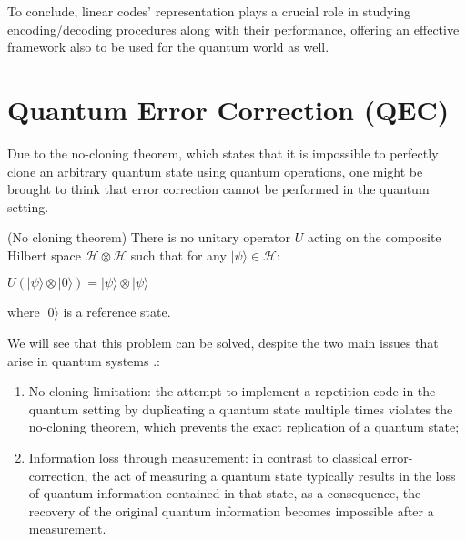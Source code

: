 \documentclass{Configuration_Files/PoliMi3i_thesis}
\begin{document}
To conclude, linear codes' representation plays a crucial role in studying encoding/decoding procedures along with their performance, offering an effective framework also to be used for the quantum world as well.










\newpage
\section{Quantum Error Correction (QEC)}
\label{sec:QEC}

Due to the no-cloning theorem, which states that  it is impossible to perfectly clone an arbitrary quantum state using quantum operations, one might be brought to think that error correction cannot be performed in the quantum setting.

\begin{theorem}(No cloning theorem)
	There is no unitary operator $U$ acting on the composite Hilbert space $\mathscr{H} \otimes \mathscr{H}$ such that for any $|\psi\rangle \in \mathscr{H}$:
	
	\begin{center}
		$U(|\psi\rangle\otimes|0\rangle) = |\psi\rangle \otimes |\psi\rangle$
	\end{center}
	
	where $|0\rangle$ is a reference state.
\end{theorem}

We will see that this problem can be solved, despite the two main issues that arise in quantum systems \cite{Cha06}.: 

\begin{enumerate}
	\item No cloning limitation: the attempt to implement a repetition code in the quantum setting by duplicating a quantum state multiple times violates the no-cloning theorem, which prevents the exact replication of a quantum state;
	
	\item Information loss through measurement: in contrast to classical error-correction, the act of measuring a quantum state typically results in the loss of quantum information contained in that state, as a consequence, the recovery of the original quantum information becomes impossible after a measurement.
\end{enumerate}
\end{document}
